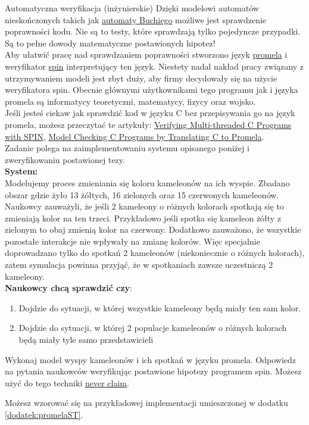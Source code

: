 \begin{exercise}{Automatyczna weryfikacja (inżynierskie)}{}
Dzięki modelowi automatów nieskończonych takich jak \href{https://en.wikipedia.org/wiki/B\%C3\%BCchi_automaton}{automaty Buchiego} możliwe jest sprawdzenie poprawności kodu. Nie są to testy, które sprawdzają tylko pojedyncze przypadki. Są to pełne dowody matematyczne postawionych hipotez! \\

Aby ułatwić pracę nad sprawdzaniem poprawności stworzono język \href{http://spinroot.com/spin/Man/promela.html}{promela} i weryfikator \href{http://spinroot.com/spin/whatispin.html}{spin} interpretujący ten język. Niestety nadal nakład pracy związany z utrzymywaniem modeli jest zbyt duży, aby firmy decydowały się na użycie weryfikatora spin. Obecnie głównymi użytkownikami tego programu jak i języka promela są informatycy teoretyczni, matematycy, fizycy oraz wojsko. \\
Jeśli jesteś ciekaw jak sprawdzić kod w języku C bez przepisywania go na język promela, możesz przeczytać te artykuły: \href{https://llvm.org/pubs/2008-08-SPIN-Pancam.pdf}{Verifying Multi-threaded C Programs with SPIN}, \href{https://www.semanticscholar.org/paper/Model-Checking-C-Programs-by-Translating-C-to-Jiang/ca9052b9650a8622d9cdb0e12dac77e6fa32234f}{Model Checking C Programs by Translating C to Promela}. \\

Zadanie polega na zaimplementowaniu systemu opisanego poniżej i zweryfikowaniu postawionej tezy. \\
\textbf{System:} \\
Modelujemy proces zmieniania się koloru kameleonów na ich wyspie. Zbadano obszar gdzie żyło 13 żółtych, 16 zielonych oraz 15 czerwonych kameleonów. Naukowcy zauważyli, że jeśli 2 kameleony o różnych kolorach spotkają się to zmieniają kolor na ten trzeci. Przykładowo jeśli spotka się kameleon żółty z zielonym to obaj zmienią kolor na czerwony. Dodatkowo zauważono, że wszystkie pozostałe interakcje nie wpływały na zmianę kolorów. Więc specjalnie doprowadzano tylko do spotkań 2 kameleonów (niekoniecznie o różnych kolorach), zatem symulacja powinna przyjąć, że w spotkaniach zawsze uczestniczą 2 kameleony. \\

\textbf{Naukowcy chcą sprawdzić czy}:
\begin{enumerate}
    \item Dojdzie do sytuacji, w której wszystkie kameleony będą miały ten sam kolor.
    \item Dojdzie do sytuacji, w której 2 populacje kameleonów o różnych kolorach będą miały tyle samo przedstawicieli
\end{enumerate}

Wykonaj model wyspy kameleonów i ich spotkań w języku promela. Odpowiedz na pytania naukowców weryfikując postawione hipotezy programem spin. Możesz użyć do tego techniki \href{http://spinroot.com/spin/Man/never.html}{never claim}.

Możesz wzorować się na przykładowej implementacji umieszczonej w dodatku \ref{dodatek:promelaST}.
\end{exercise}


